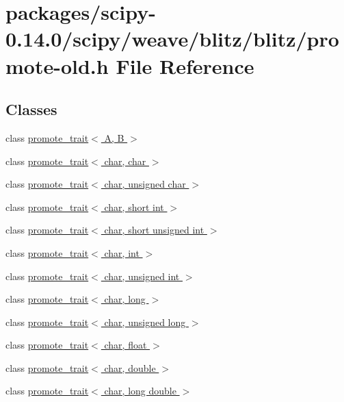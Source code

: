 \hypertarget{promote-old_8h}{}\section{packages/scipy-\/0.14.0/scipy/weave/blitz/blitz/promote-\/old.h File Reference}
\label{promote-old_8h}
\subsection*{Classes}
\begin{DoxyCompactItemize}
\item 
class \hyperlink{classpromote__trait}{promote\+\_\+trait$<$ A, B $>$}
\item 
class \hyperlink{classpromote__trait_3_01char_00_01char_01_4}{promote\+\_\+trait$<$ char, char $>$}
\item 
class \hyperlink{classpromote__trait_3_01char_00_01unsigned_01char_01_4}{promote\+\_\+trait$<$ char, unsigned char $>$}
\item 
class \hyperlink{classpromote__trait_3_01char_00_01short_01int_01_4}{promote\+\_\+trait$<$ char, short int $>$}
\item 
class \hyperlink{classpromote__trait_3_01char_00_01short_01unsigned_01int_01_4}{promote\+\_\+trait$<$ char, short unsigned int $>$}
\item 
class \hyperlink{classpromote__trait_3_01char_00_01int_01_4}{promote\+\_\+trait$<$ char, int $>$}
\item 
class \hyperlink{classpromote__trait_3_01char_00_01unsigned_01int_01_4}{promote\+\_\+trait$<$ char, unsigned int $>$}
\item 
class \hyperlink{classpromote__trait_3_01char_00_01long_01_4}{promote\+\_\+trait$<$ char, long $>$}
\item 
class \hyperlink{classpromote__trait_3_01char_00_01unsigned_01long_01_4}{promote\+\_\+trait$<$ char, unsigned long $>$}
\item 
class \hyperlink{classpromote__trait_3_01char_00_01float_01_4}{promote\+\_\+trait$<$ char, float $>$}
\item 
class \hyperlink{classpromote__trait_3_01char_00_01double_01_4}{promote\+\_\+trait$<$ char, double $>$}
\item 
class \hyperlink{classpromote__trait_3_01char_00_01long_01double_01_4}{promote\+\_\+trait$<$ char, long double $>$}
\item 

\end{DoxyCompactItemize}
